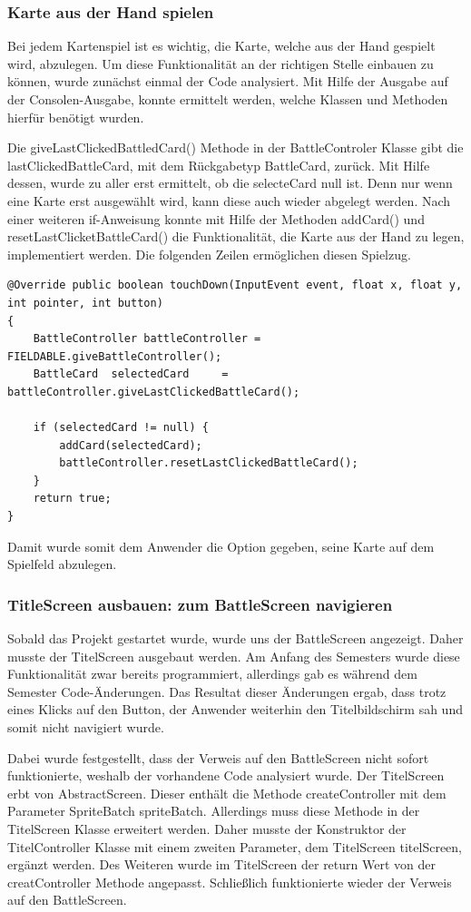 \subsubsection{Karte aus der Hand spielen}
Bei jedem Kartenspiel ist es wichtig, die Karte, welche aus der Hand gespielt wird, abzulegen. Um diese Funktionalität an der richtigen Stelle einbauen zu können, wurde zunächst einmal der Code analysiert. Mit Hilfe der Ausgabe auf der Consolen-Ausgabe, konnte ermittelt werden, welche Klassen und Methoden hierfür benötigt wurden. 

Die giveLastClickedBattledCard() Methode in der BattleControler Klasse gibt die lastClickedBattleCard, mit dem Rückgabetyp BattleCard, zurück. Mit Hilfe dessen, wurde zu aller erst ermittelt, ob die selecteCard null ist. Denn nur wenn eine Karte erst ausgewählt wird, kann diese auch wieder abgelegt werden. Nach einer weiteren if-Anweisung konnte mit Hilfe der Methoden addCard() und resetLastClicketBattleCard() die Funktionalität, die Karte aus der Hand zu legen, implementiert werden. Die folgenden Zeilen ermöglichen diesen Spielzug. 

\begin{lstlisting}
@Override public boolean touchDown(InputEvent event, float x, float y, int pointer, int button)
{
    BattleController battleController = FIELDABLE.giveBattleController();
    BattleCard  selectedCard     = battleController.giveLastClickedBattleCard();

    if (selectedCard != null) {
        addCard(selectedCard);
        battleController.resetLastClickedBattleCard();
    }
    return true;
}
\end{lstlisting}

Damit wurde somit dem Anwender die Option gegeben, seine Karte auf dem Spielfeld abzulegen. 

\subsubsection{TitleScreen ausbauen: zum BattleScreen navigieren}
Sobald das Projekt gestartet wurde, wurde uns der BattleScreen angezeigt. Daher musste der TitelScreen ausgebaut werden. Am Anfang des Semesters wurde diese Funktionalität zwar bereits programmiert, allerdings gab es während dem Semester Code-Änderungen. Das Resultat dieser Änderungen ergab, dass trotz eines Klicks auf den Button, der Anwender weiterhin den Titelbildschirm sah und somit nicht navigiert wurde. 

Dabei wurde festgestellt, dass der Verweis auf den BattleScreen nicht sofort funktionierte, weshalb der vorhandene Code analysiert wurde. Der TitelScreen erbt von AbstractScreen. Dieser enthält die Methode createController mit dem Parameter SpriteBatch spriteBatch. Allerdings muss diese Methode in der TitelScreen Klasse erweitert werden. Daher musste der Konstruktor der TitelController Klasse mit einem zweiten Parameter, dem TitelScreen titelScreen, ergänzt werden. Des Weiteren wurde im TitelScreen der return Wert von der creatController Methode angepasst. Schließlich funktionierte wieder der Verweis auf den BattleScreen. 

